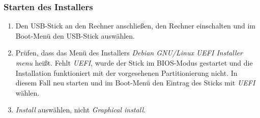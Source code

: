 \subsubsection{Starten des Installers}
\label{grundsystem-installieren-starten}
\begin{enumerate}
	\item Den USB-Stick an den Rechner anschließen, den Rechner einschalten und im Boot-Menü den USB-Stick auswählen.
	\item Prüfen, dass das Menü des Installers \textit{Debian GNU/Linux UEFI Installer menu} heißt. Fehlt \textit{UEFI}, wurde der Stick im BIOS-Modus gestartet und die Installation funktioniert mit der vorgesehenen Partitionierung nicht. In diesem Fall neu starten und im Boot-Menü den Eintrag des Sticks mit \textit{UEFI} wählen.
	\item \textit{Install} auswählen, nicht \textit{Graphical install}.
\end{enumerate}


